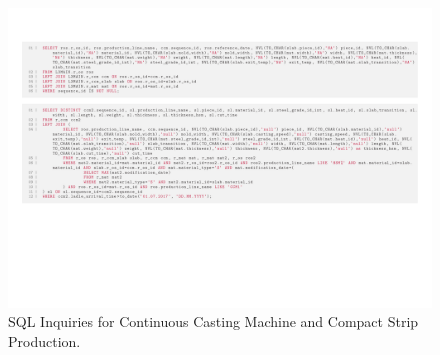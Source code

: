 \begin{landscape}
\begin{figure}[ht]
	\centering
	\includegraphics[width=1.4\textwidth]{../database_inquiries/CCM_CSP.pdf}
	\caption{SQL Inquiries for Continuous Casting Machine and Compact Strip Production.}
	\label{figure-supplements-CCM_CSP-SQL}
\end{figure}
\end{landscape}